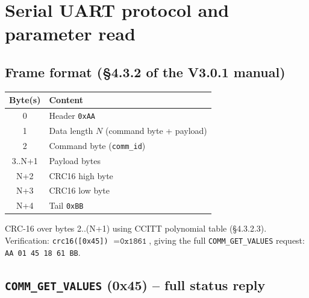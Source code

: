\documentclass[11pt,a4paper]{article}
\begin{document}
\section{Serial UART protocol and parameter read}
\label{sec:serial}

\subsection{Frame format (\S4.3.2 of the V3.0.1 manual)}

\begin{center}\small
\begin{tabular}{cl}
\toprule
Byte(s) & Content \\
\midrule
0       & Header \texttt{0xAA} \\
1       & Data length $N$ (command byte + payload) \\
2       & Command byte (\texttt{comm\_id}) \\
3..N+1  & Payload bytes \\
N+2     & CRC16 high byte \\
N+3     & CRC16 low byte \\
N+4     & Tail \texttt{0xBB} \\
\bottomrule
\end{tabular}
\end{center}

CRC-16 over bytes 2..(N+1) using CCITT polynomial table (\S4.3.2.3).
Verification: \texttt{crc16([0x45])} $= \texttt{0x1861}$, giving the
full \texttt{COMM\_GET\_VALUES} request: \texttt{AA 01 45 18 61 BB}.

\subsection{\texttt{COMM\_GET\_VALUES} (0x45) -- full status reply}
\end{document}
